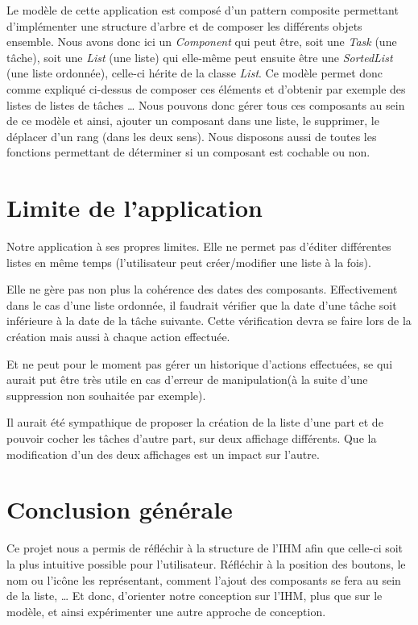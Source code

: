 \documentclass[a4paper,10pt]{article}
\begin{document}
Le modèle de cette application est composé d'un pattern composite permettant d'implémenter une structure d'arbre et de composer les différents objets ensemble.
Nous avons donc ici un \textit{Component} qui peut être, soit une \textit{Task} (une tâche), soit une \textit{List} (une liste) qui elle-même peut ensuite être
une \textit{SortedList} (une liste ordonnée), celle-ci hérite de la classe \textit{List}. Ce modèle permet donc comme expliqué ci-dessus de composer ces
éléments et d'obtenir par exemple des listes de listes de tâches \dots 
Nous pouvons donc gérer tous ces composants au sein de ce modèle et ainsi, ajouter un composant dans une liste, le supprimer, le déplacer d'un rang
(dans les deux sens). Nous disposons aussi de toutes les fonctions permettant de déterminer si un composant est cochable ou non.

\newpage
\section{Limite de l'application}
Notre application à ses propres limites. Elle ne permet pas d'éditer différentes listes en même temps (l'utilisateur peut créer/modifier une liste à la fois).

Elle ne gère pas non plus la cohérence des dates des composants. Effectivement dans le cas d'une liste ordonnée, il faudrait vérifier que la date d'une tâche
soit inférieure à la date de la tâche suivante. Cette vérification devra se faire lors de la création mais aussi à chaque action effectuée.

Et ne peut pour le moment pas gérer un historique d'actions effectuées, se qui aurait put être très utile en cas d'erreur de manipulation(à la suite d'une
suppression non souhaitée par exemple).

Il aurait été sympathique de proposer la création de la liste d'une part et de pouvoir cocher les tâches d'autre part, sur deux affichage différents. Que la
modification d'un des deux affichages est un impact sur l'autre.

\newpage
\section{Conclusion générale}
Ce projet nous a permis de réfléchir à la structure de l'IHM afin que celle-ci soit la plus intuitive possible pour l'utilisateur. Réfléchir à la position des
boutons, le nom ou l'icône les représentant, comment l'ajout des composants se fera au sein de la liste, \ldots{}
Et donc, d'orienter notre conception sur l'IHM, plus que sur le modèle, et ainsi expérimenter une autre approche de conception.
\end{document}
